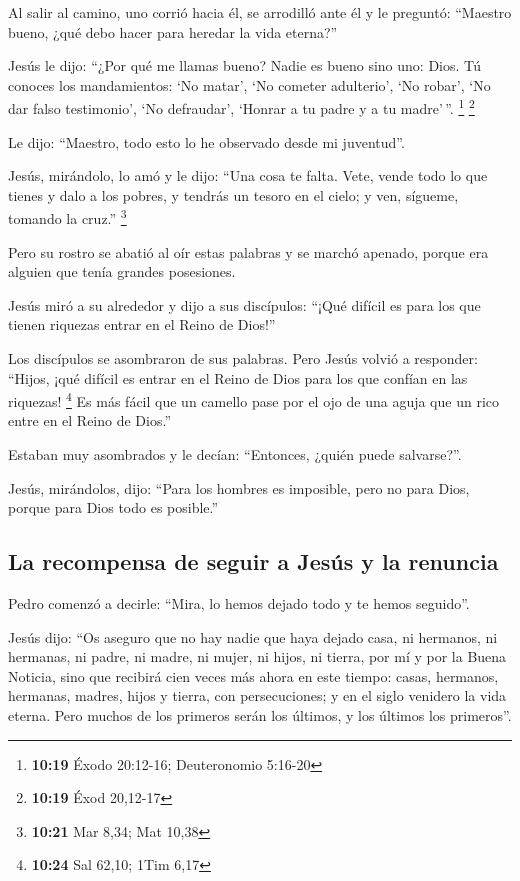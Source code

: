  Al salir al camino, uno corrió hacia él, se arrodilló
ante él y le preguntó: ``Maestro bueno, ¿qué debo hacer para heredar la
vida eterna?''

 Jesús le dijo: ``¿Por qué me llamas bueno? Nadie es
bueno sino uno: Dios.  Tú conoces los mandamientos: `No
matar', `No cometer adulterio', `No robar', `No dar falso testimonio',
`No defraudar', `Honrar a tu padre y a tu madre'\,''. \footnote{\textbf{10:19}
  Éxodo 20:12-16; Deuteronomio 5:16-20} \footnote{\textbf{10:19} Éxod
  20,12-17}

 Le dijo: ``Maestro, todo esto lo he observado desde mi
juventud''.

 Jesús, mirándolo, lo amó y le dijo: ``Una cosa te falta.
Vete, vende todo lo que tienes y dalo a los pobres, y tendrás un tesoro
en el cielo; y ven, sígueme, tomando la cruz.'' \footnote{\textbf{10:21}
  Mar 8,34; Mat 10,38}

 Pero su rostro se abatió al oír estas palabras y se
marchó apenado, porque era alguien que tenía grandes posesiones.

 Jesús miró a su alrededor y dijo a sus discípulos:
``¡Qué difícil es para los que tienen riquezas entrar en el Reino de
Dios!''

 Los discípulos se asombraron de sus palabras. Pero Jesús
volvió a responder: ``Hijos, ¡qué difícil es entrar en el Reino de Dios
para los que confían en las riquezas! \footnote{\textbf{10:24} Sal
  62,10; 1Tim 6,17}  Es más fácil que un camello pase por
el ojo de una aguja que un rico entre en el Reino de Dios.''

 Estaban muy asombrados y le decían: ``Entonces, ¿quién
puede salvarse?''.

 Jesús, mirándolos, dijo: ``Para los hombres es
imposible, pero no para Dios, porque para Dios todo es posible.''

\hypertarget{la-recompensa-de-seguir-a-jesuxfas-y-la-renuncia}{%
\subsection{La recompensa de seguir a Jesús y la
renuncia}\label{la-recompensa-de-seguir-a-jesuxfas-y-la-renuncia}}

 Pedro comenzó a decirle: ``Mira, lo hemos dejado todo y
te hemos seguido''.

 Jesús dijo: ``Os aseguro que no hay nadie que haya
dejado casa, ni hermanos, ni hermanas, ni padre, ni madre, ni mujer, ni
hijos, ni tierra, por mí y por la Buena Noticia,  sino
que recibirá cien veces más ahora en este tiempo: casas, hermanos,
hermanas, madres, hijos y tierra, con persecuciones; y en el siglo
venidero la vida eterna.  Pero muchos de los primeros
serán los últimos, y los últimos los primeros''.

